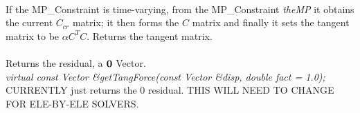  \\
If the MP\_Constraint is time-varying, from the MP\_Constraint
{\em theMP} it obtains the current $C_{cr}$ matrix; it then forms the
$C$ matrix and finally it sets the tangent matrix to be $\alpha
C^TC$. Returns the tangent matrix. \\

 \\
Returns the residual, a ${\bf 0}$ Vector. \\

{\em virtual const Vector \&getTangForce(const Vector \&disp, double
fact = 1.0);    }\\
CURRENTLY just returns the $0$ residual. THIS WILL NEED TO CHANGE FOR
ELE-BY-ELE SOLVERS. 

